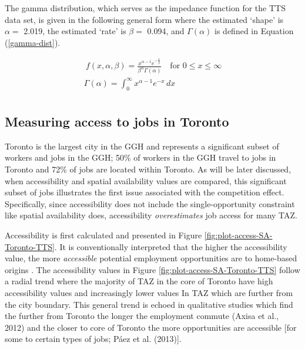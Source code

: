 \documentclass[]{elsarticle} %
\begin{document}
The gamma distribution, which serves as the impedance function for the
TTS data set, is given in the following general form where the estimated
`shape' is \(\alpha=\) 2.019, the estimated `rate' is \(\beta =\) 0.094,
and \(\Gamma(\alpha)\) is defined in Equation (\ref{gamma-dist}).

\begin{equation}
\label{gamma-dist}
\begin{array}{l}\ 
f(x, \alpha, \beta) = \frac {x^{\alpha-1}e^{-\frac{x}{\beta}}}{ \beta^{\alpha}\Gamma(\alpha)} \quad \text{for } 0 \leq x \leq \infty\\

\Gamma(\alpha) =  \int_{0}^{\infty} x^{\alpha-1}e^{-x} \,dx\\
\end{array}
\end{equation}

\hypertarget{measuring-access-to-jobs-in-toronto}{%
\subsection{Measuring access to jobs in
Toronto}\label{measuring-access-to-jobs-in-toronto}}

Toronto is the largest city in the GGH and represents a significant
subset of workers and jobs in the GGH; 50\% of workers in the GGH travel
to jobs in Toronto and 72\% of jobs are located within Toronto. As will
be later discussed, when accessibility and spatial availability values
are compared, this significant subset of jobs illustrates the first
issue associated with the competition effect. Specifically, since
accessibility does not include the single-opportunity constraint like
spatial availability does, accessibility \emph{overestimates} job access
for many TAZ.

Accessibility is first calculated and presented in Figure
\ref{fig:plot-access-SA-Toronto-TTS}. It is conventionally interpreted
that the higher the accessibility value, the more \emph{accessible}
potential employment opportunities are to home-based origins . The
accessibility values in Figure \ref{fig:plot-access-SA-Toronto-TTS}
follow a radial trend where the majority of TAZ in the core of Toronto
have high accessibility values and increasingly lower values In TAZ
which are further from the city boundary. This general trend is echoed
in qualitative studies which find the further from Toronto the longer
the employment commute (Axisa et al., 2012) and the closer to core of
Toronto the more opportunities are accessible {[}for some to certain
types of jobs; Páez et al. (2013){]}.
\end{document}
